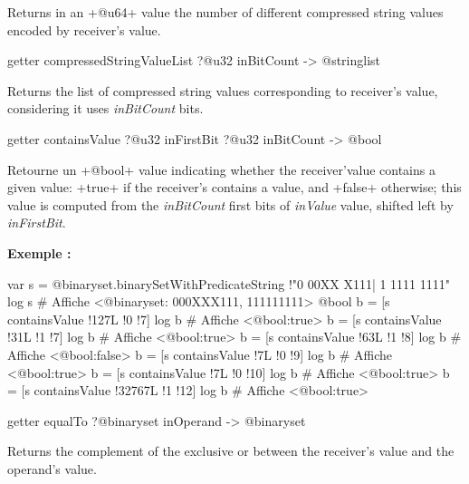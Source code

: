 Returns in an \ggsq+@u64+ value the number of different compressed string values encoded by receiver's value.




\begin{galgas4box}
getter compressedStringValueList ?@u32 inBitCount -> @stringlist
\end{galgas4box}

Returns the list of compressed string values corresponding to receiver's value, considering it uses \emph{inBitCount} bits.











\begin{galgas4box}
getter containsValue ?@u32 inFirstBit ?@u32 inBitCount -> @bool
\end{galgas4box}


Retourne un \ggsq+@bool+ value indicating whether the receiver'value contains a given value: \ggsq+true+ if the receiver's contains a value, and \ggsq+false+ otherwise; this value is computed from the \emph{inBitCount} first bits of \emph{inValue} value, shifted left by \emph{inFirstBit}.


\textbf{Exemple :}
\begin{galgas4}
var s = @binaryset.binarySetWithPredicateString {!"0 00XX X111| 1 1111 1111"}
log s # Affiche <@binaryset: 000XXX111, 111111111>
@bool b = [s containsValue !127L !0 !7]
log b # Affiche <@bool:true>
b = [s containsValue !31L !1 !7]
log b # Affiche <@bool:true>
b = [s containsValue !63L !1 !8]
log b # Affiche <@bool:false>
b = [s containsValue !7L !0 !9]
log b # Affiche <@bool:true>
b = [s containsValue !7L !0 !10]
log b # Affiche <@bool:true>
b = [s containsValue !32767L !1 !12]
log b # Affiche <@bool:true>
\end{galgas4}









\begin{galgas4box}
getter equalTo ?@binaryset inOperand -> @binaryset
\end{galgas4box}

Returns the complement of the exclusive or between the receiver's value and the operand's value.

